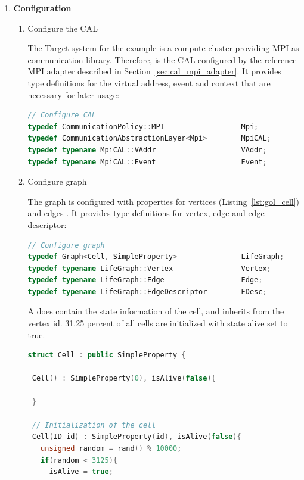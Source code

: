 \begin{enumerate}

\item \textbf{Configuration}
\begin{enumerate}

\item Configure the CAL
  
  The Target system for the example is a compute cluster providing MPI
  as communication library. Therefore, is the CAL configured by the
  reference MPI adapter described in
  Section~\ref{sec:cal_mpi_adapter}. It provides type definitions for
  the virtual address, event and context that are necessary for later
  usage:

  \begin{lstlisting}[language=C++, label=lst:conf_cal, caption={\ }]
// Configure CAL
typedef CommunicationPolicy::MPI                  Mpi;
typedef CommunicationAbstractionLayer<Mpi>        MpiCAL;
typedef typename MpiCAL::VAddr                    VAddr;
typedef typename MpiCAL::Event                    Event;
  \end{lstlisting}

\item Configure graph

  The graph is configured with properties for vertices 
  (Listing~\ref{lst:gol_cell}) and edges . It
  provides type definitions for vertex, edge and edge descriptor:

  \begin{lstlisting}[language=C++, label=lst:conf_graph, caption={\ }]
// Configure graph
typedef Graph<Cell, SimpleProperty>               LifeGraph;
typedef typename LifeGraph::Vertex                Vertex;
typedef typename LifeGraph::Edge                  Edge;
typedef typename LifeGraph::EdgeDescriptor        EDesc;
  \end{lstlisting}

  A  does contain the state information of the cell, and
  inherits from  the vertex id. 31.25
  percent of all cells are initialized with state alive set to true.

\begin{lstlisting}[language=C++, label=lst:gol_cell, caption={\ }]
struct Cell : public SimpleProperty { 

 Cell() : SimpleProperty(0), isAlive(false){ 
          
 }
        
 // Initialization of the cell
 Cell(ID id) : SimpleProperty(id), isAlive(false){ 
   unsigned random = rand() % 10000;
   if(random < 3125){ 
     isAlive = true;
     

\end{lstlisting}
\end{enumerate}
\end{enumerate}
